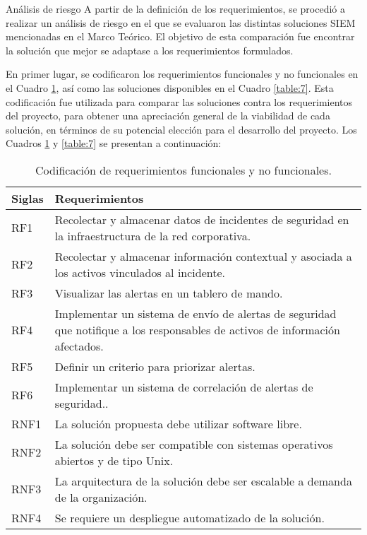     \begin{section}{Análisis de riesgo}
    A partir de la definición de los requerimientos, se procedió a realizar un análisis de riesgo en el que se evaluaron las distintas soluciones SIEM mencionadas en el Marco Teórico. El objetivo de esta comparación fue encontrar la solución que mejor se adaptase a los requerimientos formulados. \par
    En primer lugar, se codificaron los requerimientos funcionales y no funcionales en el Cuadro \ref{table:6}, así como las soluciones disponibles en el Cuadro \ref{table:7}. Esta codificación fue utilizada para comparar las soluciones contra los requerimientos del proyecto, para obtener una apreciación general de la viabilidad de cada solución, en términos de su potencial elección para el desarrollo del proyecto. Los Cuadros \ref{table:6} y \ref{table:7} se presentan a continuación:
    \begin{table}[H]
        \centering
        \begin{tabular}{|m{4em}|m{30em}|}
        
            \hline 
                Siglas  & Requerimientos \\ 
            \hline
                RF1 & Recolectar y almacenar datos de incidentes de seguridad en la infraestructura de la red corporativa. \\ 
            \hline
                RF2  & Recolectar y almacenar información contextual y asociada a los activos vinculados al incidente. \\ 
            \hline
                RF3 & Visualizar las alertas en un tablero de mando. \\
            \hline
                RF4 & Implementar un sistema de envío de alertas de seguridad que notifique a los responsables de activos de información afectados. \\
            \hline
                RF5 & Definir un criterio para priorizar alertas. \\
            \hline
                RF6 & Implementar un sistema de correlación de alertas de seguridad.. \\
            \hline
                RNF1 & La solución propuesta debe utilizar software libre. \\
            \hline
                RNF2 & La solución debe ser compatible con sistemas operativos abiertos y de tipo Unix. \\
            \hline
                RNF3 & La arquitectura de la solución debe ser escalable a demanda de la organización. \\
            \hline
                RNF4 & Se requiere un despliegue automatizado de la solución. \\
            \hline %
        \end{tabular}
        \caption{Codificación de requerimientos funcionales y no funcionales.}
        \label{table:6}
    \end{table}
    \begin{table}[H]
        \centering
        \begin{tabular}{|m{6em}|m{20em}|}
        

\end{tabular}
\end{table}
\end{section}
